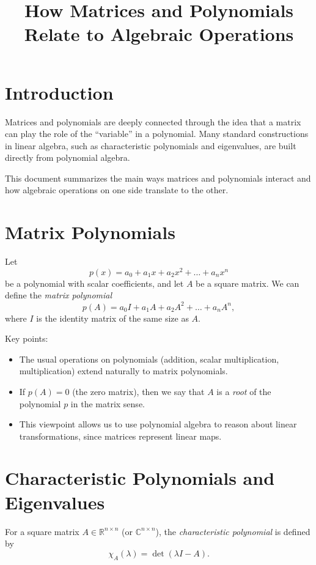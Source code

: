 \documentclass[11pt]{article}
\title{How Matrices and Polynomials Relate to Algebraic Operations}
\author{}
\date{}
\begin{document}
\maketitle

\section{Introduction}

Matrices and polynomials are deeply connected through the idea that a matrix can play the role of the ``variable'' in a polynomial. Many standard constructions in linear algebra, such as characteristic polynomials and eigenvalues, are built directly from polynomial algebra.

This document summarizes the main ways matrices and polynomials interact and how algebraic operations on one side translate to the other.

\section{Matrix Polynomials}

Let
\[
p(x) = a_0 + a_1 x + a_2 x^2 + \dots + a_n x^n
\]
be a polynomial with scalar coefficients, and let \(A\) be a square matrix. We can define the \emph{matrix polynomial}
\[
p(A) = a_0 I + a_1 A + a_2 A^2 + \dots + a_n A^n,
\]
where \(I\) is the identity matrix of the same size as \(A\).

Key points:
\begin{itemize}
  \item The usual operations on polynomials (addition, scalar multiplication, multiplication) extend naturally to matrix polynomials.
  \item If \(p(A) = 0\) (the zero matrix), then we say that \(A\) is a \emph{root} of the polynomial \(p\) in the matrix sense.
  \item This viewpoint allows us to use polynomial algebra to reason about linear transformations, since matrices represent linear maps.
\end{itemize}

\section{Characteristic Polynomials and Eigenvalues}

For a square matrix \(A \in \mathbb{R}^{n \times n}\) (or \(\mathbb{C}^{n \times n}\)), the \emph{characteristic polynomial} is defined by
\[
\chi_A(\lambda) = \det(\lambda I - A).
\]
\end{document}
